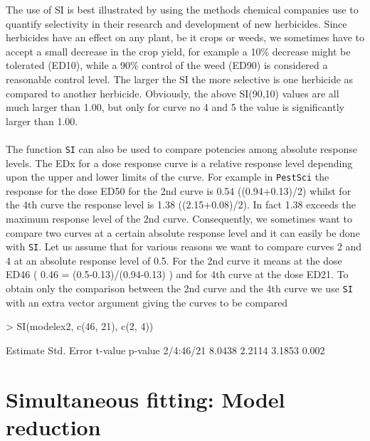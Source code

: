 \documentclass[a4paper]{article}
\begin{document}
The use of SI is best illustrated by using the methods chemical
companies use to quantify selectivity in their research and
development of new herbicides. Since herbicides have an effect on
any plant, be it crops or weeds, we sometimes have to accept a
small decrease in the crop yield, for example a 10\% decrease
might be tolerated (ED10), while a 90\% control of the weed
(ED90) is considered a reasonable control level. The larger the
SI the more selective is one herbicide as compared to another herbicide. Obviously, the above SI(90,10) values are all much
larger than 1.00, but only for curve no 4 and 5 the value is significantly larger than 1.00.
\\
\\
The function \verb+SI+ can also be used to compare potencies among absolute
response levels. The EDx for a dose response curve is a relative response level depending upon
the upper and lower limits of the curve. For example in \verb+PestSci+ the response for the dose ED50 for the 2nd curve is
0.54 ((0.94+0.13)/2) whilst for the 4th curve the response level is 1.38 ((2.15+0.08)/2). In fact 1.38
exceeds the maximum response level of the 2nd curve. Consequently, we sometimes want to compare two curves
at a certain absolute response level and it can easily be done with \verb+SI+. Let us assume that
for various reasons we want to compare curves 2 and 4 at an absolute response level of 0.5. For the 2nd curve it means at the
dose ED46 ( 0.46 = (0.5-0.13)/(0.94-0.13) ) and for 4th curve at the dose ED21.
To obtain only the comparison between the 2nd curve and the 4th curve we use \verb+SI+ with an extra vector argument giving the curves to be compared

\begin{Schunk}
\begin{Sinput}
> SI(modelex2, c(46, 21), c(2, 4))
\end{Sinput}
\begin{Soutput}
          Estimate Std. Error t-value p-value
2/4:46/21   8.0438     2.2114  3.1853   0.002
\end{Soutput}
\end{Schunk}



\newpage
\section{Simultaneous fitting: Model reduction} \label{sec:6}
\end{document}
